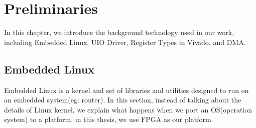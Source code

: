 \chapter{Preliminaries}
\label{cha:Preliminaries}
In this chapter, we introduce the background technology used in our work, including Embedded Linux, UIO Driver, Register Types in Vivado, and DMA.



\section{Embedded Linux}
\label{sec:Embedded Linux}

Embedded Linux is a kernel and set of libraries and utilities designed to run
on an embedded system(eg: router). In this section, instead of talking about the details of Linux kernel, we explain what happens when we port an OS(operation system) to a platform, in this thesis, we use FPGA as our platform. 

